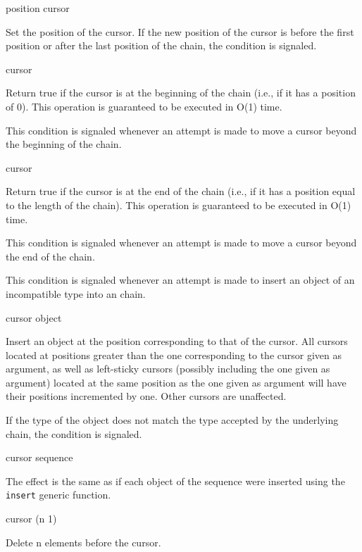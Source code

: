 \documentclass[11pt]{article}
\begin{document}
 {position cursor}

Set the position of the cursor.  If the new position of the cursor is
before the first position or after the last position of the chain, the
condition  is signaled. 

 {cursor}

Return true if the cursor is at the beginning of the chain (i.e., if
it has a position of 0).  This operation is guaranteed to be executed
in O(1) time. 


This condition is signaled whenever an attempt is made to move a
cursor beyond the beginning of the chain. 

 {cursor}

Return true if the cursor is at the end of the chain (i.e., if it has
a position equal to the length of the chain).  This operation is
guaranteed to be executed in O(1) time.


This condition is signaled whenever an attempt is made to move a
cursor beyond the end of the chain. 


This condition is signaled whenever an attempt is made to insert an
object of an incompatible type into an chain. 

 {cursor object}

Insert an object at the position corresponding to that of the cursor. 
All cursors located at positions greater than the one corresponding to
the cursor given as argument, as well as left-sticky cursors (possibly
including the one given as argument)  located at the same position as
the one given as argument will have their positions incremented by
one. Other cursors are unaffected. 

If the type of the object does not match the type accepted by the
underlying chain, the  condition is
signaled.

 {cursor sequence}

The effect is the same as if each object of the sequence were
inserted using the \texttt{insert} generic function. 

 {cursor \optional (n 1)}

Delete n elements before the cursor.
\end{document}
